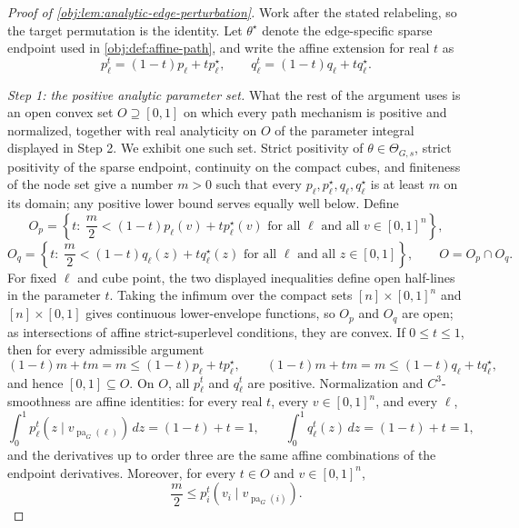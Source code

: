 \begin{proof}[Proof of \cref{obj:lem:analytic-edge-perturbation}]
Work after the stated relabeling, so the target permutation is the identity.  Let
\(\theta^\star\) denote the edge-specific sparse endpoint used in
\cref{obj:def:affine-path}, and write the affine extension for real \(t\) as
\[
p_\ell^t=(1-t)p_\ell+t p_\ell^\star,\qquad
q_\ell^t=(1-t)q_\ell+t q_\ell^\star .
\]

\emph{Step 1: the positive analytic parameter set.}
What the rest of the argument uses is an open convex set \(O\supseteq[0,1]\) on which every path mechanism is positive and normalized, together with real analyticity on \(O\) of the parameter integral displayed in Step 2.  We exhibit one such set.  Strict positivity of \(\theta\in\Theta_{G,s}\), strict positivity of the sparse endpoint, continuity on the compact cubes, and finiteness of the node set give a number \(m>0\) such that every \(p_\ell,p_\ell^\star,q_\ell,q_\ell^\star\) is at least \(m\) on its domain; any positive lower bound serves equally well below.  Define
\[
O_p=\left\{t:\ \frac m2<(1-t)p_\ell(v)+t p_\ell^\star(v)
\text{ for all }\ell\text{ and all }v\in[0,1]^n\right\},
\]
\[
O_q=\left\{t:\ \frac m2<(1-t)q_\ell(z)+t q_\ell^\star(z)
\text{ for all }\ell\text{ and all }z\in[0,1]\right\},
\qquad O=O_p\cap O_q .
\]
For fixed \(\ell\) and cube point, the two displayed inequalities define open half-lines in the parameter \(t\).  Taking the infimum over the compact sets \([n]\times[0,1]^n\) and \([n]\times[0,1]\) gives continuous lower-envelope functions, so \(O_p\) and \(O_q\) are open; as intersections of affine strict-superlevel conditions, they are convex.  If \(0\le t\le1\), then for every admissible argument
\[
(1-t)m+tm=m
\le (1-t)p_\ell+t p_\ell^\star,
\qquad
(1-t)m+tm=m
\le (1-t)q_\ell+t q_\ell^\star,
\]
and hence \([0,1]\subseteq O\).  On \(O\), all \(p_\ell^t\) and \(q_\ell^t\) are positive.  Normalization and \(C^3\)-smoothness are affine identities: for every real \(t\), every \(v\in[0,1]^n\), and every \(\ell\),
\[
\int_0^1 p_\ell^t(z\mid v_{\operatorname{pa}_G(\ell)})\,dz
=(1-t)+t=1,\qquad
\int_0^1 q_\ell^t(z)\,dz=(1-t)+t=1,
\]
and the derivatives up to order three are the same affine combinations of the endpoint derivatives.  Moreover, for every \(t\in O\) and \(v\in[0,1]^n\),
\[
\frac m2\le p_i^t(v_i\mid v_{\operatorname{pa}_G(i)}).
\]


\end{proof}
